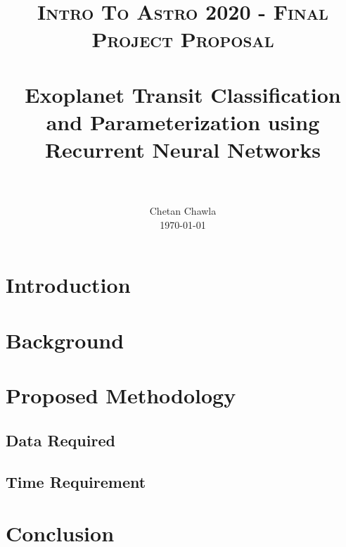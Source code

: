 \documentclass[paper=letterpaper, fontsize=11pt]{scrartcl}
\title{
		\usefont{OT1}{bch}{b}{n}
		\normalfont \normalsize \textsc{Intro To Astro 2020 - Final Project Proposal} \\ [25pt]
		\horrule{0.5pt} \\[0.4cm]
		\huge Exoplanet Transit Classification and Parameterization using Recurrent Neural Networks \\
		\horrule{2pt} \\[0.5cm]
}
\author{
	\normalfont 				\normalsize
        Chetan Chawla	\\		\normalsize
        \today
}
\date{}
\numberwithin{equation}{section}		%
\numberwithin{figure}{section}			%
\numberwithin{table}{section}			%
\begin{document}
\maketitle

\section{Introduction}


\section{Background}






\section{Proposed Methodology}



\subsection{Data Required}

\subsection{Time Requirement}



\section{Conclusion}
\end{document}
